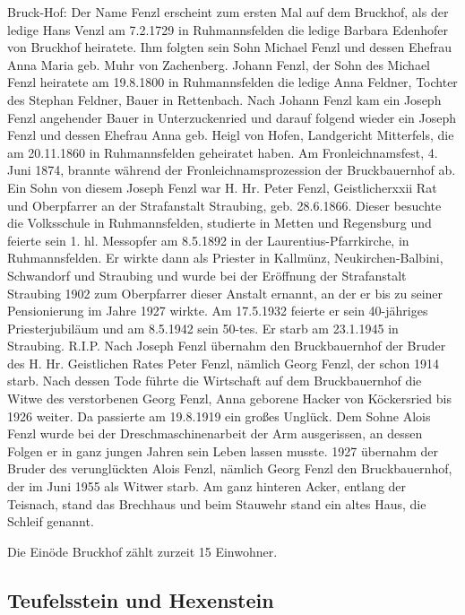 \documentclass[12pt,a4pager]{book}
\begin{document}
Bruck-Hof: Der Name Fenzl erscheint zum ersten Mal auf dem Bruckhof, als der
ledige Hans Venzl am 7.2.1729 in Ruhmannsfelden die ledige Barbara Edenhofer von
Bruckhof heiratete. Ihm folgten sein Sohn Michael Fenzl und dessen Ehefrau Anna
Maria geb. Muhr von Zachenberg. Johann Fenzl, der Sohn des Michael Fenzl
heiratete am 19.8.1800 in Ruhmannsfelden die ledige Anna Feldner, Tochter des
Stephan Feldner, Bauer in Rettenbach. Nach Johann Fenzl kam ein Joseph Fenzl
angehender Bauer in Unterzuckenried und darauf folgend wieder ein Joseph Fenzl
und dessen Ehefrau Anna geb. Heigl von Hofen, Landgericht Mitterfels, die am
20.11.1860 in Ruhmannsfelden geheiratet haben. Am Fronleichnamsfest, 4. Juni
1874, brannte während der Fronleichnamsprozession der Bruckbauernhof ab. Ein
Sohn von diesem Joseph Fenzl war H. Hr. Peter Fenzl, Geistlicherxxii Rat und
Oberpfarrer an der Strafanstalt Straubing, geb. 28.6.1866. Dieser besuchte die
Volksschule in Ruhmannsfelden, studierte in Metten und Regensburg und feierte
sein 1. hl. Messopfer am 8.5.1892 in der Laurentius-Pfarrkirche, in
Ruhmannsfelden. Er wirkte dann als Priester in Kallmünz, Neukirchen-Balbini,
Schwandorf und Straubing und wurde bei der Eröffnung der Strafanstalt Straubing
1902 zum Oberpfarrer dieser Anstalt ernannt, an der er bis zu seiner
Pensionierung im Jahre 1927 wirkte. Am 17.5.1932 feierte er sein 40-jähriges
Priesterjubiläum und am 8.5.1942 sein 50-tes. Er starb am 23.1.1945 in
Straubing. R.I.P. Nach Joseph Fenzl übernahm den Bruckbauernhof der Bruder des
H. Hr. Geistlichen Rates Peter Fenzl, nämlich Georg Fenzl, der schon 1914 starb.
Nach dessen Tode führte die Wirtschaft auf dem Bruckbauernhof die Witwe des
verstorbenen Georg Fenzl, Anna geborene Hacker von Köckersried bis 1926 weiter.
Da passierte am 19.8.1919 ein großes Unglück. Dem Sohne Alois Fenzl wurde bei
der Dreschmaschinenarbeit der Arm ausgerissen, an dessen Folgen er in ganz
jungen Jahren sein Leben lassen musste. 1927 übernahm der Bruder des
verunglückten Alois Fenzl, nämlich Georg Fenzl den Bruckbauernhof, der im Juni
1955 als Witwer starb. Am ganz hinteren Acker, entlang der Teisnach, stand das
Brechhaus und beim Stauwehr stand ein altes Haus, die Schleif genannt.

Die Einöde Bruckhof zählt zurzeit 15 Einwohner.

\subsection{Teufelsstein und Hexenstein}
\end{document}
